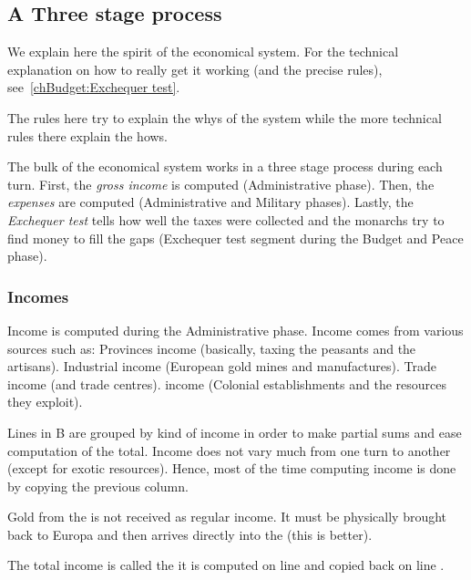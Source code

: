 \subsection{A Three stage process}\label{chThePowers:Exchequer}
\begin{designnote}
  We explain here the spirit of the economical system. For the technical
  explanation on how to really get it working (and the precise rules),
  see~\ref{chBudget:Exchequer test}.

  The rules here try to explain the whys of the system while the more
  technical rules there explain the hows.
\end{designnote}

\aparag The bulk of the economical system works in a three stage process
during each turn.
\bparag First, the \emph{gross income} is computed (Administrative phase).
\bparag Then, the \emph{expenses} are computed (Administrative and Military
phases).
\bparag Lastly, the \emph{Exchequer test} tells how well the taxes were
collected and the monarchs try to find money to fill the gaps (Exchequer test
segment during the Budget and Peace phase).

 


\subsubsection{Incomes}
\aparag Income is computed during the Administrative phase. Income comes from
various sources such as:
\bparag Provinces income (basically, taxing the peasants and the artisans).
\bparag Industrial income (European gold mines and manufactures).
\bparag Trade income (\TradeFLEET and trade centres).
\bparag \ROTW income (Colonial establishments and the resources they exploit).

\aparag Lines in \EcoRS B are grouped by kind of income in order to make
partial sums and ease computation of the total.
\bparag Income does not vary much from one turn to another (except for exotic
resources). Hence, most of the time computing income is done by copying the
previous column.

\aparag Gold from the \ROTW is not received as regular income. It must be
physically brought back to Europa and then arrives directly into the \RT (this
is better).

\aparag The total income is called the  it is computed on
line  and copied back on line .


